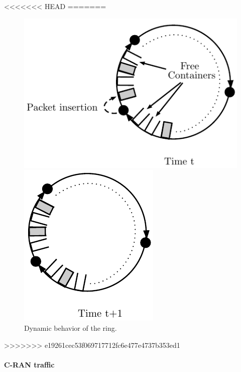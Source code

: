 \documentclass[10pt, conference, letterpaper]{IEEEtran}
\begin{document}
<<<<<<< HEAD
=======
  \begin{figure}[h!]

        \begin{center}
      \hspace{-2.3cm}\includegraphics[scale=0.7]{containers}
   
   \vspace{0.5cm}
   
      \includegraphics[scale=0.7]{containers2}
      \end{center} 

   
     \caption{Dynamic behavior of the ring.}\label{fig:containers}

  \end{figure}
  
>>>>>>> e19261cec53f069717712fc6e477e4737b353ed1
     \paragraph{C-RAN traffic}
   
\end{document}

